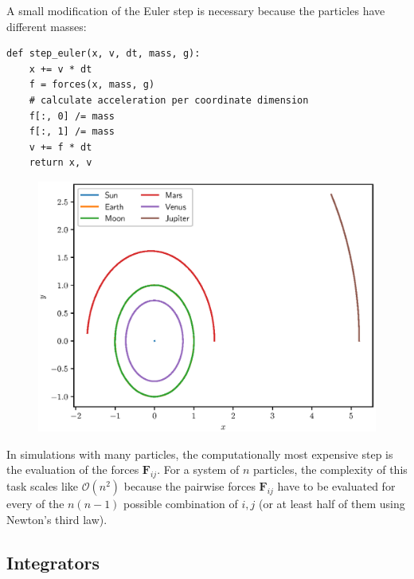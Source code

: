 \documentclass[a4paper,10pt,bibtotoc]{scrartcl}
\begin{document}
A small modification of the Euler step is necessary because the particles have different masses:
\begin{lstlisting}
def step_euler(x, v, dt, mass, g):
    x += v * dt
    f = forces(x, mass, g)
    # calculate acceleration per coordinate dimension
    f[:, 0] /= mass
    f[:, 1] /= mass
    v += f * dt
    return x, v
\end{lstlisting}




\begin{figure}[t]
 \includegraphics{Figure_4.eps}
 \caption{}
 \label{fig:fig4}
\end{figure}

\noindent In simulations with many particles, the computationally most expensive step is the evaluation of the forces $\mathbf{F}_{ij}$. For a system of $n$ particles, the complexity of this task scales like $\mathcal{O}\left(n^2\right)$ because the pairwise forces $\mathbf{F}_{ij}$ have to be evaluated for every of the $n(n-1)$ possible combination of $i,j$ (or at least half of them using Newton's third law).

\subsection{Integrators}
\end{document}
